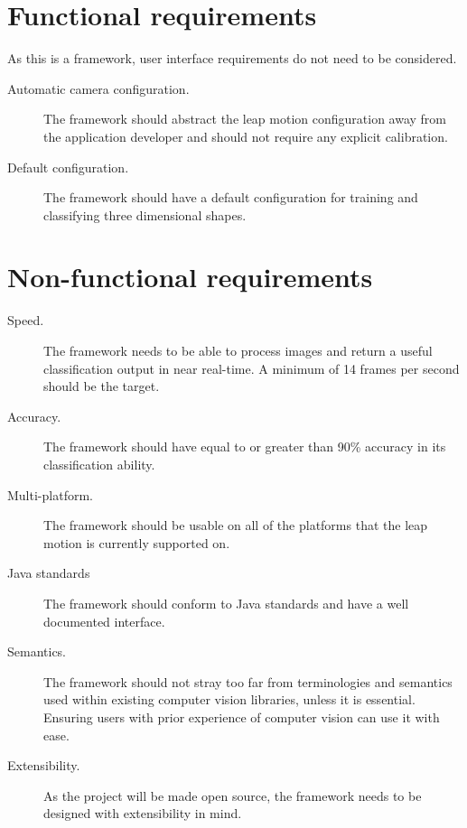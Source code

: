 \documentclass[11pt,oneside]{report}
\begin{document}
		\section{Functional requirements}
			
			As this is a framework, user interface requirements do not need to be considered.
			\begin{description}
				\item[Automatic camera configuration.] The framework should abstract the leap motion configuration away from the application developer and should not require any explicit calibration.
				\item[Default configuration.] The framework should have a default configuration for training and classifying three dimensional shapes.
			\end{description}
				
			
		\section{Non-functional requirements}
			\begin{description}
				\item[Speed.] The framework needs to be able to process images and return a useful classification output in near real-time. 
				A minimum of 14 frames per second should be the target.
				\item[Accuracy.] The framework should have equal to or greater than 90\% accuracy in its classification ability.
				\item[Multi-platform.] The framework should be usable on all of the platforms that the leap motion is currently supported on.
				\item[Java standards] The framework should conform to Java standards and have a well documented interface.
				\item[Semantics.] The framework should not stray too far from terminologies and semantics used within existing computer vision libraries, unless it is essential. Ensuring users with prior experience of computer vision can use it with ease.
				\item[Extensibility.] As the project will be made open source, the framework needs to be designed with extensibility in mind.
			\end{description}
			
\end{document}
